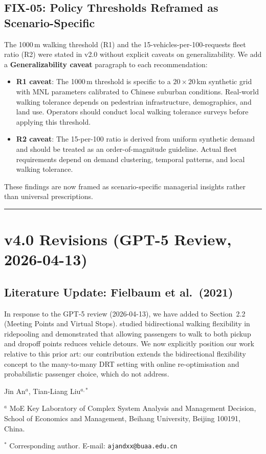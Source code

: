 \documentclass[12pt]{article}
\begin{document}
\subsection*{FIX-05: Policy Thresholds Reframed as Scenario-Specific}

The 1000\,m walking threshold (R1) and the 15-vehicles-per-100-requests fleet
ratio (R2) were stated in v2.0 without explicit caveats on generalizability.
We add a \textbf{Generalizability caveat} paragraph to each recommendation:
\begin{itemize}
  \item \textbf{R1 caveat}: The 1000\,m threshold is specific to a
        $20 \times 20$\,km synthetic grid with MNL parameters calibrated to
        Chinese suburban conditions. Real-world walking tolerance depends on
        pedestrian infrastructure, demographics, and land use. Operators should
        conduct local walking tolerance surveys before applying this threshold.
  \item \textbf{R2 caveat}: The 15-per-100 ratio is derived from uniform
        synthetic demand and should be treated as an order-of-magnitude
        guideline. Actual fleet requirements depend on demand clustering,
        temporal patterns, and local walking tolerance.
\end{itemize}
These findings are now framed as scenario-specific managerial insights rather
than universal prescriptions.

\bigskip\hrule\bigskip

\section*{v4.0 Revisions (GPT-5 Review, 2026-04-13)}

\subsection*{Literature Update: Fielbaum et al.\ (2021)}

In response to the GPT-5 review (2026-04-13), we have added \citet{fielbaum2021} to
Section~2.2 (Meeting Points and Virtual Stops). \citet{fielbaum2021} studied bidirectional
walking flexibility in ridepooling and demonstrated that allowing passengers to walk to
both pickup and dropoff points reduces vehicle detours. We now explicitly position our
work relative to this prior art: our contribution extends the bidirectional flexibility
concept to the many-to-many DRT setting with online re-optimisation and probabilistic
passenger choice, which \citet{fielbaum2021} do not address.

\bigskip\bigskip

\noindent Jin An$^{a}$, Tian-Liang Liu$^{a,*}$

\medskip

\noindent $^{a}$ MoE Key Laboratory of Complex System Analysis and Management Decision,\\
School of Economics and Management, Beihang University, Beijing 100191, China.

\noindent $^{*}$ Corresponding author. E-mail: \texttt{ajandxx@buaa.edu.cn}
\end{document}
